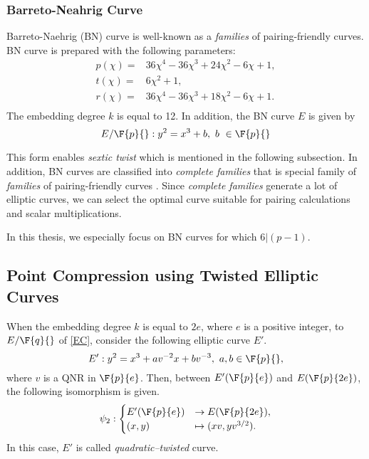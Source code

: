 \subsubsection{Barreto-Neahrig Curve}
Barreto-Naehrig (BN) curve is well-known as a {\it families} of pairing-friendly curves.
BN curve is prepared with the following parameters:
\begin{align*}
p(\chi)=&36\chi^4-36\chi^3+24\chi^2-6\chi+1, \\
t(\chi)=&6\chi^2+1,\\
r(\chi)=&36\chi^4-36\chi^3+18\chi^2-6\chi+1. \\
\end{align*} 
The embedding degree $k$ is equal to 12.
In addition, the BN curve $E$ is given by
\begin{equation}
E/\F{p}{} : y^2 = x^3 + b,\ b\ \in \F{p}{}\nonumber
\end{equation}

This form enables {\em sextic twist} which is mentioned in the following subsection. 
In addition, BN curves are classified into {\it complete families} that is special family of {\it families} of pairing-friendly curves \cite{Taxo}.
Since {\it complete families} generate a lot of elliptic curves, we can select the optimal curve suitable for pairing calculations and scalar multiplications.

In this thesis, we especially focus on BN curves for which $6|(p-1)$.

\subsection{Point Compression using Twisted Elliptic Curves}\label{sec:twist}

When the embedding degree $k$ is equal to $2e$, where $e$ is a positive integer, to $E/\F{q}{}$ of \eqref{EC}, consider the following elliptic curve $E'$.
\begin{equation}
E':y^2=x^3+av^{-2}x+bv^{-3},\ a,b\in \F{p}{}, \label{TEC}
\end{equation}
where $v$ is a QNR in $\F{p}{e}$. Then, between $E'(\F{p}{e})$ and $E(\F{p}{2e})$, the following isomorphism is given.
\begin{eqnarray}
\psi_2 : 
\begin{cases}
E'(\F{p}{e}) & \rightarrow  E(\F{p}{2e}), \\
(x,y) & \mapsto (xv,yv^{3/2}).
\end{cases} \label{2t}
\end{eqnarray}
In this case, $E'$ is called {\it quadratic--twisted} curve.

